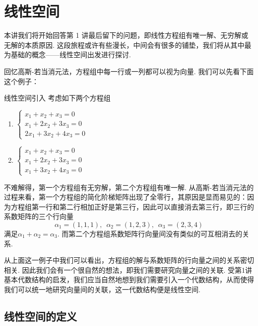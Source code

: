 \chapter{线性空间}

本讲我们将开始回答第 1 讲最后留下的问题，即线性方程组有唯一解、无穷解或无解的本质原因. 这段旅程或许有些漫长，中间会有很多的铺垫，我们将从其中最为基础的概念——线性空间出发进行探讨.

回忆高斯-若当消元法，方程组中每一行或一列都可以视为向量. 我们可以先看下面这个例子：
\begin{example}{}{线性空间引入}
    考虑如下两个方程组
    \begin{multicols}{2}
        \begin{enumerate}
            \item $\begin{cases}
                          x_1+x_2+x_3=0   \\
                          x_1+2x_2+3x_3=0 \\
                          2x_1+3x_2+4x_3=0
                      \end{cases}$

            \item $\begin{cases}
                          x_1+x_2+x_3=0   \\
                          x_1+2x_2+3x_3=0 \\
                          x_1+3x_2+4x_3=0
                      \end{cases}$
        \end{enumerate}
    \end{multicols}
    不难解得，第一个方程组有无穷解，第二个方程组有唯一解. 从高斯-若当消元法的过程来看，第一个方程组的简化阶梯矩阵出现了全零行，其原因是显而易见的：因为方程组第一行和第二行相加正好是第三行，因此可以直接消去第三行，即三行的系数矩阵的三个行向量
    \[\alpha_1=(1,1,1),\enspace\alpha_2=(1,2,3),\enspace\alpha_3=(2,3,4)\]
    满足$\alpha_1+\alpha_2=\alpha_3$. 而第二个方程组系数矩阵行向量间没有类似的可互相消去的关系.
\end{example}

从上面这一例子中我们可以看出，方程组的解与系数矩阵的行向量之间的关系密切相关. 因此我们会有一个很自然的想法，即我们需要研究向量之间的关联. 受第1讲基本代数结构的启发，我们应当自然地想到我们需要引入一个代数结构，从而使得我们可以统一地研究向量间的关联，这一代数结构便是线性空间.

\section{线性空间的定义}

